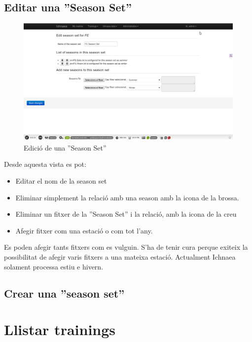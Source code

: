 \subsection{Editar una ''Season Set''}
\begin{figure}[h!]
  \centering
  \includegraphics[scale=0.2]{img/userguide/season_set_edition.png}
  \caption{Edici\'{o} de una ''Season Set''}
  \label{fig:placement}
\end{figure}
Desde aquesta vista es pot:
\begin{itemize}
\item Editar el nom de la season set
\item Eliminar simplement la relaci\'{o} amb una season amb la icona de la brossa.
\item Eliminar un fitxer de la ''Season Set'' i la relaci\'{o}, amb la icona de la creu
\item Afegir fitxer com una estaci\'{o} o com tot l'any.
\end{itemize}
Es poden afegir tants fitxers com es vulguin. S'ha de tenir cura perque exiteix la possibilitat de afegir varis fitxers a una mateixa estaci\'{o}. Actualment Ichnaea solament processa estiu e hivern.

\subsection{Crear una ''season set''}

\section{Llistar trainings}


